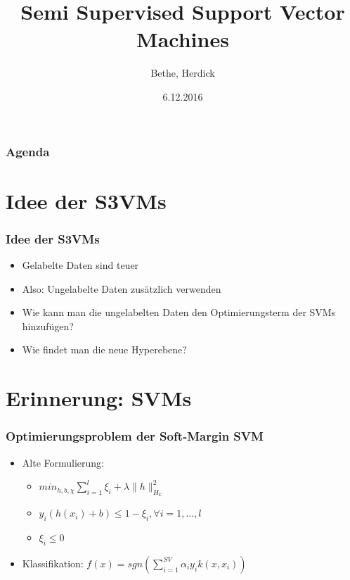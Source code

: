 \documentclass{beamer}
\title{Semi Supervised Support Vector Machines}
\author{Bethe, Herdick}
\date{6.12.2016}
\institute{Classification Algorithms FIN OvGU}
\begin{document}

\newcommand {\framedgraphic}[2] {
    \begin{frame}{#1}
        \begin{center}
            \texttt{[image: \#2]}
        \end{center}
    \end{frame}
}

\begin{frame}[plain]
\titlepage
\end{frame}


\section[Agenda]{}
\begin{frame}
\frametitle{Agenda}
\tableofcontents
\end{frame}

\section{Idee der S3VMs}
\begin{frame}
\frametitle{Idee der S3VMs}
    \begin{itemize}
        \item Gelabelte Daten sind teuer
        \item Also: Ungelabelte Daten zus\"atzlich verwenden
        \item Wie kann man die ungelabelten Daten den Optimierungsterm der SVMs hinzuf\"ugen?
        \item Wie findet man die neue Hyperebene?
    \end{itemize}
\end{frame}




\section{Erinnerung: SVMs}

\begin{frame}
\frametitle{Optimierungsproblem der Soft-Margin SVM}
    \begin{itemize}
    	\item Alte Formulierung:
    	\begin{itemize}
    		\item $min_{h,b,\chi} \sum_{i=1}^l \xi_i + \lambda \|h\|^2_{H_k}$
    		\item $y_i(h(x_i) + b) \leq 1 - \xi_i, \forall i=1,...,l$
    		\item $\xi_i \leq 0$
    	\end{itemize}
    	\item Klassifikation: $f(x) = sgn\left(\sum_{i=1}^{SV} \alpha_i y_i k(x, x_i)\right)$
    \end{itemize} 
\end{frame}
\end{document}
